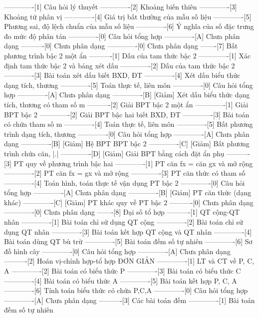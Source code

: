-------------[1] Câu hỏi lý thuyết
-------------[2] Khoảng biến thiên
-------------[3] Khoảng tứ phân vị
-------------[4] Giá trị bất thường của mẫu số liệu
-------------[5] Phương sai, độ lệch chuẩn của mẫu số liệu
-------------[6] Ý nghĩa của số đặc trưng đo mức độ phân tán
-------------[0] Câu hỏi tổng hợp
-------------[A] Chưa phân dạng
----------[0] Chưa phân dạng
-------------[0] Chưa phân dạng
-------[7] Bất phương trình bậc 2 một ẩn
----------[1] Dấu của tam thức bậc 2
-------------[1] Xác định tam thức bậc 2 và bảng xét dấu
-------------[2] Dấu của tam thức bậc 2
-------------[3] Bài toán xét dấu biết BXD, ĐT
-------------[4] Xét dấu biểu thức dạng tích, thương
-------------[5] Toán thực tế, liên môn
-------------[0] Câu hỏi tổng hợp
-------------[A] Chưa phân dạng
-------------[B] [Giảm] Xét dấu biểu thức dạng tích, thương có tham số m
----------[2] Giải BPT bậc 2 một ẩn
-------------[1] Giải BPT bậc 2
-------------[2] Giải BPT bậc hai biết BXD, ĐT
-------------[3] Bài toán có chứa tham số m
-------------[4] Toán thực tế, liên môn
-------------[5] Bất phương trình dạng tích, thương
-------------[0] Câu hỏi tổng hợp
-------------[A] Chưa phân dạng
-------------[B] [Giảm] Hệ BPT BPT bậc 2
-------------[C] [Giảm] Bất phương trình chứa căn, |.|
-------------[D] [Giảm] Giải BPT bằng cách đặt ẩn phụ
----------[3] PT quy về phương trình bậc hai
-------------[1] PT căn fx = căn gx và mở rộng
-------------[2] PT căn fx = gx và mở rộng
-------------[3] PT căn thức có tham số
-------------[4] Toán hình, toán thực tế vận dụng PT bậc 2
-------------[0] Câu hỏi tổng hợp
-------------[A] Chưa phân dạng
-------------[B] [Giảm] PT căn thức (dạng khác)
-------------[C] [Giảm] PT khác quy về PT bậc 2
----------[0] Chưa phân dạng
-------------[0] Chưa phân dạng
-------[8] Đại số tổ hợp
----------[1] QT cộng-QT nhân
-------------[1] Bài toán chỉ sử dụng QT cộng
-------------[2] Bài toán chỉ sử dụng QT nhân
-------------[3] Bài toán kết hợp QT cộng và QT nhân
-------------[4] Bài toán dùng QT bù trừ
-------------[5] Bài toán đếm số tự nhiên
-------------[6] Sơ đồ hình cây
-------------[0] Câu hỏi tổng hợp
-------------[A] Chưa phân dạng
----------[2] Hoán vị-chỉnh hợp-tổ hợp ĐƠN GIẢN
-------------[1] LT và CT về P, C, A
-------------[2] Bài toán có biểu thức P
-------------[3] Bài toán có biểu thức C
-------------[4] Bài toán có biểu thức A
-------------[5] Bài toán kết hợp P, C, A
-------------[6] Tính toán biểu thức có chứa P,C,A
-------------[0] Câu hỏi tổng hợp
-------------[A] Chưa phân dạng
----------[3] Các bài toán đếm 
-------------[1] Bài toán đếm số tự nhiên
